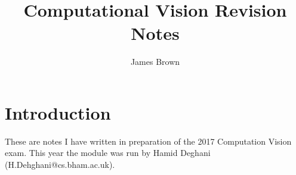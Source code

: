 \documentclass{article}
\title{Computational Vision \linebreak Revision Notes}
\author{James Brown}
\begin{document}
	\maketitle
	\newpage
	\tableofcontents
	\newpage
	
	\section{Introduction}
	These are notes I have written in preparation of the 2017 Computation Vision exam. This year the module was run by Hamid Deghani (H.Dehghani@cs.bham.ac.uk).
	
	\newpage
	\printindex
	
\end{document}
